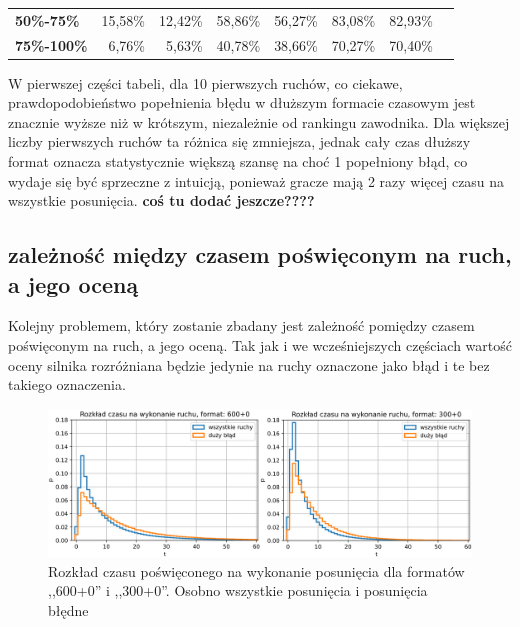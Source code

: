 \documentclass[inzynierska]{pwr_wmat_praca_dyplomowa}
\theoremstyle{plain}
\numberwithin{theorem}{chapter}
\theoremstyle{definition}
\numberwithin{theorem}{chapter}
\begin{document}
\begin{table}[H]
\begin{tabular}{|l|r|r|r|r|r|r|l}
		\textbf{50\%-75\%}                                                      & 15,58\%                             & 12,42\%                             & 58,86\%                             & 56,27\%                             & 83,08\%                             & 82,93\%                             &           \\ \cline{1-7}
		\textbf{75\%-100\%}                                                     & 6,76\%                              & 5,63\%                              & 40,78\%                             & 38,66\%                             & 70,27\%                             & 70,40\%                             &           \\ \cline{1-7}
	\end{tabular}
	\label{tab:blad_w_n_ruchach} 
\end{table}
W pierwszej części tabeli, dla 10 pierwszych ruchów, co ciekawe, prawdopodobieństwo popełnienia błędu w dłuższym formacie czasowym jest znacznie wyższe niż w krótszym, niezależnie od rankingu zawodnika. Dla większej liczby pierwszych ruchów ta różnica się zmniejsza, jednak cały czas dłuższy format oznacza statystycznie większą szansę na choć 1 popełniony błąd, co wydaje się być sprzeczne z intuicją, ponieważ gracze mają 2 razy więcej czasu na wszystkie posunięcia. \textbf{coś tu dodać jeszcze????}


\subsection{zależność między czasem poświęconym na ruch, a jego oceną}


Kolejny problemem, który zostanie zbadany jest zależność pomiędzy czasem poświęconym na ruch, a jego oceną. Tak jak i we wcześniejszych częściach wartość oceny silnika rozróżniana będzie jedynie na ruchy oznaczone jako błąd i te bez takiego oznaczenia.
\begin{figure}[H]
	\centering
	\includegraphics[width=\textwidth]{rozklad_czasu.png}
	\caption{Rozkład czasu poświęconego na wykonanie posunięcia dla formatów ,,600+0'' i ,,300+0''. Osobno wszystkie posunięcia i posunięcia błędne}
	\label{rys:rozklad_czasu}
\end{figure}
\end{document}
